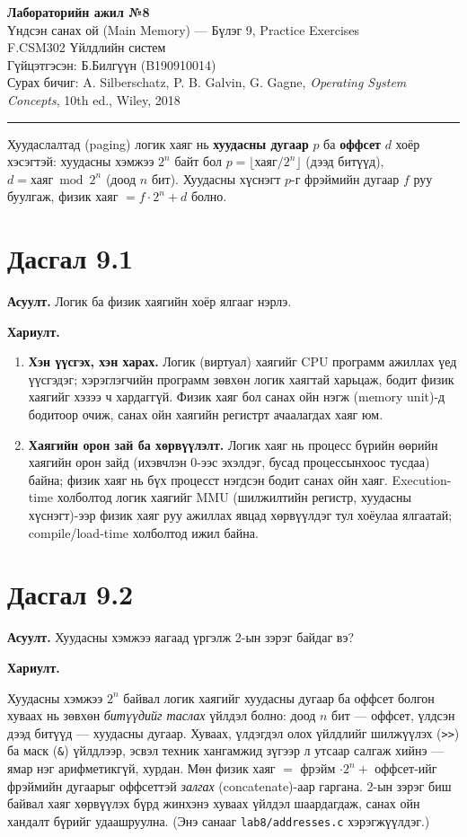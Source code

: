\documentclass[12pt,a4paper]{article}
\newcommand{\question}[2]{\section{Дасгал #1}\textbf{Асуулт.} #2\par\medskip\textbf{Хариулт.}\par}
\begin{document}
\begin{center}
  {\Large\bfseries Лабораторийн ажил №8}\\[0.4em]
  {\large Үндсэн санах ой (Main Memory) — Бүлэг 9, Practice Exercises}\\[0.8em]
  F.CSM302 Үйлдлийн систем\\
  Гүйцэтгэсэн: Б.Билгүүн (B190910014)\\[0.3em]
  Сурах бичиг: A. Silberschatz, P. B. Galvin, G. Gagne, \textit{Operating System Concepts}, 10th ed., Wiley, 2018
\end{center}
\hrule
\bigskip

Хуудаслалтад (paging) логик хаяг нь \textbf{хуудасны дугаар} $p$ ба \textbf{оффсет} $d$ хоёр хэсэгтэй: хуудасны хэмжээ $2^n$ байт бол $p = \lfloor \text{хаяг} / 2^n \rfloor$ (дээд битүүд), $d = \text{хаяг} \bmod 2^n$ (доод $n$ бит). Хуудасны хүснэгт $p$-г фрэймийн дугаар $f$ руу буулгаж, физик хаяг $= f \cdot 2^n + d$ болно.

\question{9.1}{Логик ба физик хаягийн хоёр ялгааг нэрлэ.}

\begin{enumerate}[leftmargin=1.5em]
  \item \textbf{Хэн үүсгэх, хэн харах.} Логик (виртуал) хаягийг CPU программ ажиллах үед үүсгэдэг; хэрэглэгчийн программ зөвхөн логик хаягтай харьцаж, бодит физик хаягийг хэзээ ч хардаггүй. Физик хаяг бол санах ойн нэгж (memory unit)-д бодитоор очиж, санах ойн хаягийн регистрт ачаалагдах хаяг юм.
  \item \textbf{Хаягийн орон зай ба хөрвүүлэлт.} Логик хаяг нь процесс бүрийн өөрийн хаягийн орон зайд (ихэвчлэн 0-ээс эхэлдэг, бусад процессынхоос тусдаа) байна; физик хаяг нь бүх процесст нэгдсэн бодит санах ойн хаяг. Execution-time холболтод логик хаягийг MMU (шилжилтийн регистр, хуудасны хүснэгт)-ээр физик хаяг руу ажиллах явцад хөрвүүлдэг тул хоёулаа ялгаатай; compile/load-time холболтод ижил байна.
\end{enumerate}

\question{9.2}{Хуудасны хэмжээ яагаад үргэлж 2-ын зэрэг байдаг вэ?}

Хуудасны хэмжээ $2^n$ байвал логик хаягийг хуудасны дугаар ба оффсет болгон хуваах нь зөвхөн \emph{битүүдийг таслах} үйлдэл болно: доод $n$ бит — оффсет, үлдсэн дээд битүүд — хуудасны дугаар. Хуваах, үлдэгдэл олох үйлдлийг шилжүүлэх (\texttt{>>}) ба маск (\texttt{\&}) үйлдлээр, эсвэл техник хангамжид зүгээр л утсаар салгаж хийнэ — ямар нэг арифметикгүй, хурдан. Мөн физик хаяг $=$ фрэйм $\cdot 2^n +$ оффсет-ийг фрэймийн дугаарыг оффсеттэй \emph{залгах} (concatenate)-аар гаргана. 2-ын зэрэг биш байвал хаяг хөрвүүлэх бүрд жинхэнэ хуваах үйлдэл шаардагдаж, санах ойн хандалт бүрийг удаашруулна. (Энэ санааг \texttt{lab8/addresses.c} хэрэгжүүлдэг.)
\end{document}
